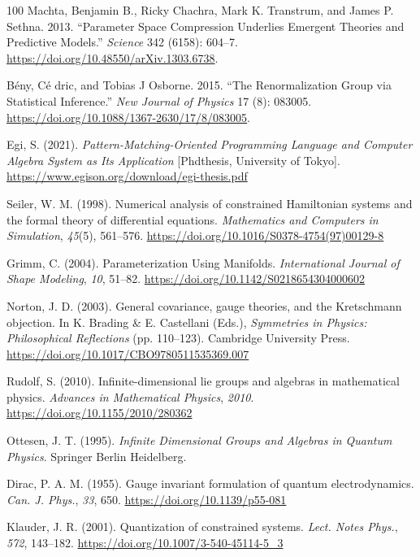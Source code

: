 \documentclass[11pt]{book}
\begin{document}
\begin{thebibliography}{100}
 Machta, Benjamin B., Ricky Chachra, Mark K. Transtrum, and James P.
Sethna. 2013. {``Parameter Space Compression Underlies Emergent Theories
and Predictive Models.''} \emph{Science} 342 (6158): 604--7.
\url{https://doi.org/10.48550/arXiv.1303.6738}.

 Bény, Cé dric, and Tobias J Osborne. 2015. {``The Renormalization Group
via Statistical Inference.''} \emph{New Journal of Physics} 17 (8):
083005. \url{https://doi.org/10.1088/1367-2630/17/8/083005}.

 Egi, S. (2021). \emph{Pattern-Matching-Oriented Programming Language and
Computer Algebra System as Its Application} {[}Phdthesis, University of
Tokyo{]}. \url{https://www.egison.org/download/egi-thesis.pdf}

 Seiler, W. M. (1998). Numerical analysis of constrained Hamiltonian
systems and the formal theory of differential equations.
\emph{Mathematics and Computers in Simulation}, \emph{45}(5), 561--576.
\url{https://doi.org/10.1016/S0378-4754(97)00129-8}

 Grimm, C. (2004). Parameterization Using Manifolds. \emph{International
Journal of Shape Modeling}, \emph{10}, 51--82.
\url{https://doi.org/10.1142/S0218654304000602}

 Norton, J. D. (2003). General covariance, gauge theories, and the
Kretschmann objection. In K. Brading \& E. Castellani (Eds.),
\emph{Symmetries in Physics: Philosophical Reflections} (pp. 110--123).
Cambridge University Press.
\url{https://doi.org/10.1017/CBO9780511535369.007}

 Rudolf, S. (2010). Infinite-dimensional lie groups and algebras in
mathematical physics. \emph{Advances in Mathematical Physics},
\emph{2010}. \url{https://doi.org/10.1155/2010/280362}

 Ottesen, J. T. (1995). \emph{Infinite Dimensional Groups and Algebras in
Quantum Physics}. Springer Berlin Heidelberg.

 Dirac, P. A. M. (1955). Gauge invariant formulation of quantum
electrodynamics. \emph{Can. J. Phys.}, \emph{33}, 650.
\url{https://doi.org/10.1139/p55-081}

 Klauder, J. R. (2001). Quantization of constrained systems. \emph{Lect.
Notes Phys.}, \emph{572}, 143--182.
\url{https://doi.org/10.1007/3-540-45114-5_3}


\end{thebibliography}
\end{document}
